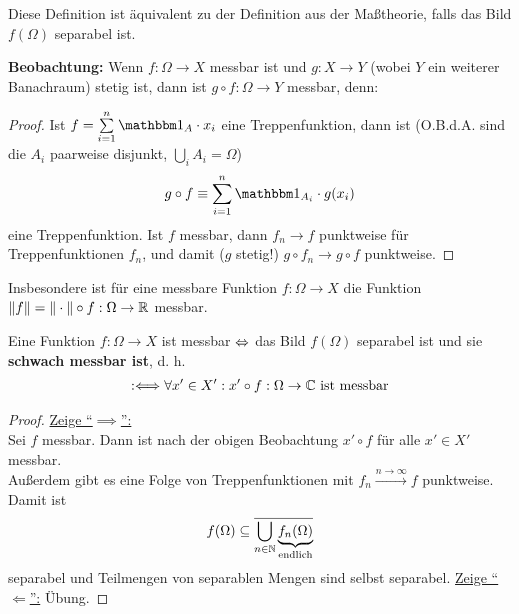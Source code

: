 \begin{bemerkung}
	Diese Definition ist äquivalent zu der Definition aus der Maßtheorie, falls das Bild $f(\Omega)$ separabel ist.
\end{bemerkung}

\textbf{Beobachtung:} Wenn $f:\Omega\to X$ messbar ist und $g:X\to Y$ (wobei $Y$ ein weiterer Banachraum) stetig ist, dann ist $g\circ f:\Omega\to Y$ messbar, denn:

\begin{proof}
	Ist $f=\sum\limits_{i=1}^n\indi_A\cdot x_i$ eine Treppenfunktion, dann ist (O.B.d.A. sind die $A_i$ paarweise disjunkt, $\bigcup\limits_i A_i=\Omega$)
	\begin{align*}
		g\circ f\equiv\sum\limits_{i=1}^n\indi_{A_i}\cdot g(x_i)
	\end{align*}
	eine Treppenfunktion. 
	Ist $f$ messbar, dann $f_n\longrightarrow f$ punktweise für Treppenfunktionen $f_n$, und damit ($g$ stetig!) $g\circ f_n\to g\circ f$ punktweise.
\end{proof}

Insbesondere ist für eine messbare Funktion $f:\Omega\to X$ die Funktion\\ $\Vert f\Vert=\Vert\cdot\Vert\circ f:\Omega\to\mathbb{R}$ messbar.

\begin{theorem}[Pettis]\label{theoremPettis}\enter
	Eine Funktion $f:\Omega\to X$ ist messbar $\Leftrightarrow$ das Bild $f(\Omega)$ separabel ist und sie \textbf{schwach messbar ist}, d. h.
	\begin{align*}
		:\Longleftrightarrow\forall x'\in X':x'\circ f:\Omega\to\mathbb{C}\text{ ist messbar}
	\end{align*}
\end{theorem}

\begin{proof}
	\underline{Zeige ``$\implies$'':}\\
	Sei $f$ messbar. Dann ist nach der obigen Beobachtung $x'\circ f$ für alle $x'\in X'$ messbar.\\
	Außerdem gibt es eine Folge von Treppenfunktionen mit $f_n\stackrel{n\to\infty}{\longrightarrow} f$ punktweise. 
	Damit ist
	\begin{align*}
		f(\Omega)\subseteq\overline{\bigcup\limits_{n\in\mathbb{N}}\underbrace{ f_n(\Omega)}_{\text{endlich}}}
	\end{align*}
	separabel und Teilmengen von separablen Mengen sind selbst separabel.\nl
	\underline{Zeige ``$\Longleftarrow$'':} Übung.
\end{proof}

